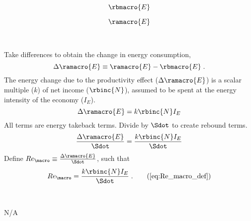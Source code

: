 

\begin{landscape}

\linespread{1}


\sectionsep{}

{
\begin{equation}
  \rbmacro{E}
\end{equation}
}
{
}

\sectionsep{}

{
\begin{equation}
\ramacro{E}
\end{equation}
}
{
}

\sectionsep{}

\derivsection{}
{
~

Take differences to obtain the change in energy consumption,
%
\begin{equation}
  \Delta \ramacro{E} \equiv \ramacro{E} - \rbmacro{E} \; .
\end{equation}
%
The energy change due to the productivity effect ($\Delta \ramacro{E}$) 
is a scalar multiple ($k$) of net income ($\rbinc{N}$), 
assumed to be spent at the energy intensity of the economy ($I_E$).
%
\begin{equation}
  \Delta \ramacro{E} = k \rbinc{N} I_E
\end{equation}
%
All terms are energy takeback terms.
Divide by $\Sdot$
to create rebound terms.
%
\begin{equation}
  \frac{\Delta \ramacro{E}}{\Sdot} = \frac{k \rbinc{N} I_E}{\Sdot}
\end{equation}
%
Define 
$Re_{\macro} \equiv \frac{\Delta \ramacro{E}}{\Sdot}$, 
such that
%
\begin{equation}
  Re_{\macro} = \frac{k \rbinc{N} I_E}{\Sdot} \; . \tag{\ref{eq:Re_macro_def}}
\end{equation}
%
}
{
~
\centering

N/A
}
\end{landscape}
